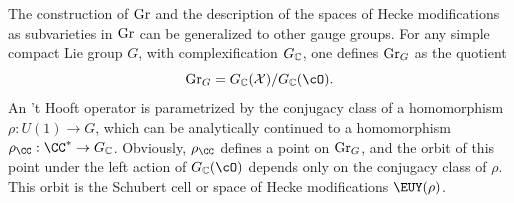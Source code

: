 The construction of ${\rm Gr}$ and the description of the spaces
of Hecke modifications as subvarieties in ${\rm Gr}$ can be
generalized to other gauge groups. For any simple compact Lie
group $G$, with complexification $G_{\Bbb{C}}$, one defines ${\rm
Gr}_G$ as the quotient %
\setcounter{equation}{33}
\begin{equation}\label{eq:hxonoh}
{\rm Gr}_G=G_{\Bbb{C}}({\cal
X})/G_{\Bbb{C}}(\cO).
\end{equation}
 An 't Hooft operator is parametrized by
the conjugacy class of a homomorphism $\rho: U(1)\to G$, which can
be analytically continued to a homomorphism $\rho_\CC: \CC^*\to
G_{\Bbb{C}}$. Obviously, $\rho_\CC$ defines a point on ${\rm
Gr}_G$, and the orbit of this point under the left action of
$G_{\Bbb{C}}(\cO)$ depends only on the conjugacy class of $\rho$.
This orbit is the Schubert cell or space of Hecke modifications
${{\EUY}}(\rho)$.

